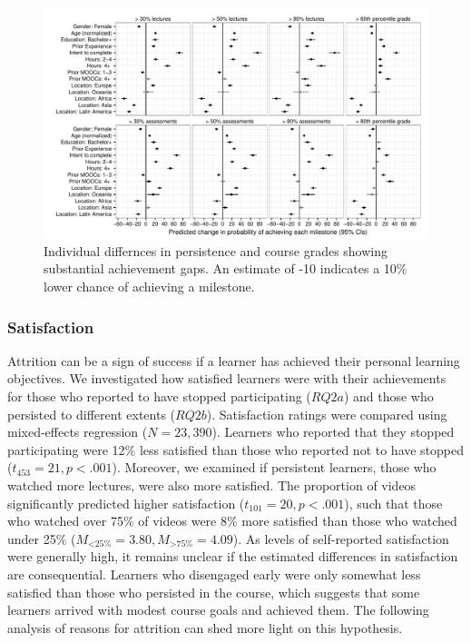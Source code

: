 \documentclass{sigchi}\usepackage[]{graphicx}\usepackage[]{color}
\makeatletter
\def\maxwidth{ %
  \ifdim\Gin@nat@width>\linewidth
    \linewidth
  \else
    \Gin@nat@width
  \fi
}
\newenvironment{knitrout}{}{} %
\makeatother
\begin{document}
\begin{knitrout}
\color{fgcolor}\begin{figure}[ht]

\includegraphics[width=\maxwidth]{figure/s1coefs} \caption[Individual differnces in persistence and course grades showing substantial achievement gaps]{Individual differnces in persistence and course grades showing substantial achievement gaps. An estimate of -10 indicates a 10\% lower chance of achieving a milestone.\label{fig:s1coefs}}
\end{figure}


\end{knitrout}

\subsubsection{Satisfaction}

Attrition can be a sign of success if a learner has achieved their personal learning objectives. We investigated how satisfied learners were with their achievements for those who reported to have stopped participating ($RQ2a$) and those who persisted to different extents ($RQ2b$). Satisfaction ratings were compared using mixed-effects regression ($N=23,390$). Learners who reported that they stopped participating were 12\% less satisfied than those who reported not to have stopped ($t_{453}=21, p<.001$). Moreover, we examined if persistent learners, those who watched more lectures, were also more satisfied. The proportion of videos significantly predicted higher satisfaction ($t_{101}=20, p<.001$), such that those who watched over 75\% of videos were 8\% more satisfied than those who watched under 25\% ($M_{<\text{25\%}}=3.80, M_{>\text{75\%}}=4.09$). As levels of self-reported satisfaction were generally high, it remains unclear if the estimated differences in satisfaction are consequential. Learners who disengaged early were only somewhat less satisfied than those who persisted in the course, which suggests that some learners arrived with modest course goals and achieved them. The following analysis of reasons for attrition can shed more light on this hypothesis.
\end{document}
